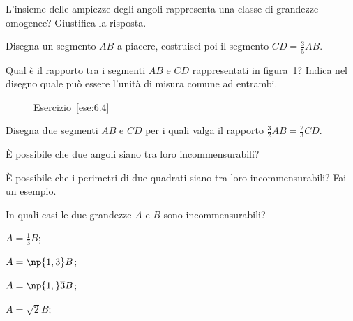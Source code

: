 \begin{esercizio}
\label{ese:6.2}
L'insieme delle ampiezze degli angoli rappresenta una classe di 
grandezze omogenee? Giustifica la risposta.
\end{esercizio}

\begin{esercizio}
\label{ese:6.3}
Disegna un segmento \(AB\) a piacere, costruisci poi il segmento 
\(CD=\frac{3}{5}AB\).
\end{esercizio}

\begin{esercizio}
\label{ese:6.4}
Qual è il rapporto tra i segmenti \(AB\) e \(CD\) rappresentati in 
figura~\ref{fig:ese6.4}? Indica nel disegno quale può essere l'unità 
di misura comune ad entrambi.
\end{esercizio}
\begin{inaccessibleblock}
 \begin{figure}[!htb]
  \centering
  \caption{Esercizio~\ref{ese:6.4}}\label{fig:ese6.4}
\end{figure}
\end{inaccessibleblock}

\begin{esercizio}
\label{ese:6.5}
Disegna due segmenti \(AB\) e \(CD\) per i quali valga il rapporto 
\(\frac{3}{2}AB=\frac{2}{3}CD\).
\end{esercizio}

\begin{esercizio}
\label{ese:6.6}
È possibile che due angoli siano tra loro incommensurabili?
\end{esercizio}

\begin{esercizio}
\label{ese:6.7}
È possibile che i perimetri di due quadrati siano tra loro 
incommensurabili? Fai un esempio.
\end{esercizio}

\begin{esercizio}
\label{ese:6.8}
In quali casi le due grandezze \(A\) e \(B\) sono incommensurabili?
\begin{multicols}{4}
\begin{enumeratea}
\item \(A=\frac{1}{3}B\);
\item \(A=\np{1,3}B\);
\item \(A=\np{1,}\overline{3}B\);
\item \(A=\sqrt{2}B\);
\end{enumeratea}
\end{multicols}
\end{esercizio}

